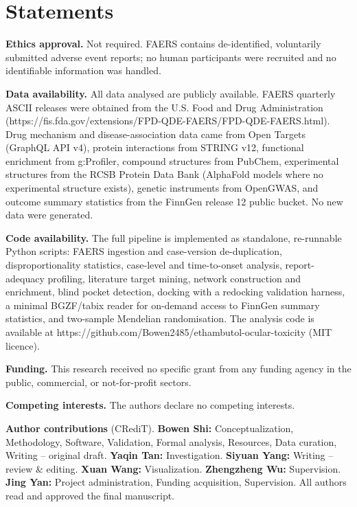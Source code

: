 \documentclass[utf8]{FrontiersinVancouver}
\begin{document}
\section{Statements}

\textbf{Ethics approval.} Not required. FAERS contains de-identified, voluntarily submitted adverse event reports; no human participants were recruited and no identifiable information was handled.

\textbf{Data availability.} All data analysed are publicly available. FAERS quarterly ASCII releases were obtained from the U.S. Food and Drug Administration (https://fis.fda.gov/extensions/FPD-QDE-FAERS/FPD-QDE-FAERS.html). Drug mechanism and disease-association data came from Open Targets (GraphQL API v4), protein interactions from STRING v12, functional enrichment from g:Profiler, compound structures from PubChem, experimental structures from the RCSB Protein Data Bank (AlphaFold models where no experimental structure exists), genetic instruments from OpenGWAS, and outcome summary statistics from the FinnGen release 12 public bucket. No new data were generated.

\textbf{Code availability.} The full pipeline is implemented as standalone, re-runnable Python scripts: FAERS ingestion and case-version de-duplication, disproportionality statistics, case-level and time-to-onset analysis, report-adequacy profiling, literature target mining, network construction and enrichment, blind pocket detection, docking with a redocking validation harness, a minimal BGZF/tabix reader for on-demand access to FinnGen summary statistics, and two-sample Mendelian randomisation. The analysis code is available at https://github.com/Bowen2485/ethambutol-ocular-toxicity (MIT licence).

\textbf{Funding.} This research received no specific grant from any funding agency in the public, commercial, or not-for-profit sectors.

\textbf{Competing interests.} The authors declare no competing interests.

\textbf{Author contributions} (CRediT). \textbf{Bowen Shi:} Conceptualization, Methodology, Software, Validation, Formal analysis, Resources, Data curation, Writing -- original draft. \textbf{Yaqin Tan:} Investigation. \textbf{Siyuan Yang:} Writing -- review \& editing. \textbf{Xuan Wang:} Visualization. \textbf{Zhengzheng Wu:} Supervision. \textbf{Jing Yan:} Project administration, Funding acquisition, Supervision. All authors read and approved the final manuscript.
\end{document}
